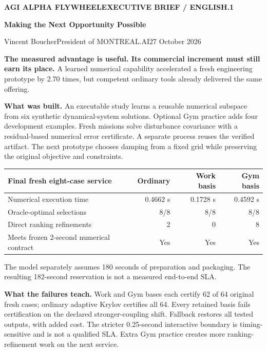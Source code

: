 \documentclass[10pt,letterpaper]{article}
\begin{document}
{\small\bfseries\color{teal}AGI ALPHA FLYWHEEL\hfill EXECUTIVE BRIEF / ENGLISH.1}

{\LARGE\bfseries\color{navy}Making the Next Opportunity Possible}

{\large Vincent Boucher}\quad President of MONTREAL.AI\hfill 27 October 2026

\colorbox{pale}{\parbox{0.95\linewidth}{\vspace{7pt}\textbf{The measured advantage is useful. Its commercial increment must still earn its place.} A learned numerical capability accelerated a fresh engineering prototype by 2.70 times, but competent ordinary tools already delivered the same offering.\vspace{7pt}}}

\textbf{What was built.} An executable study learns a reusable numerical subspace from six synthetic dynamical-system solutions. Optional Gym practice adds four development examples. Fresh missions solve disturbance covariance with a residual-based numerical error certificate. A separate process reuses the verified artifact. The next prototype chooses damping from a fixed grid while preserving the original objective and constraints.

\begin{center}\begin{tabularx}{\linewidth}{Yrrr}\toprule
Final fresh eight-case service & Ordinary & Work basis & Gym basis\\\midrule
Numerical execution time &0.4662 s&0.1728 s&0.4592 s\\
Oracle-optimal selections &8/8&8/8&8/8\\
Direct ranking refinements &2&0&8\\
Meets frozen 2-second numerical contract &Yes&Yes&Yes\\\bottomrule
\end{tabularx}\end{center}

{\small The model separately assumes 180 seconds of preparation and packaging. The resulting 182-second reservation is not a measured end-to-end SLA.}

\textbf{What the failures teach.} Work and Gym bases each certify 62 of 64 original fresh cases; ordinary adaptive Krylov certifies all 64. Every retained basis fails certification on the declared stronger-coupling shift. Fallback restores all tested outputs, with added cost. The stricter 0.25-second interactive boundary is timing-sensitive and is not a qualified SLA. Extra Gym practice creates more ranking-refinement work on the next service.
\end{document}
